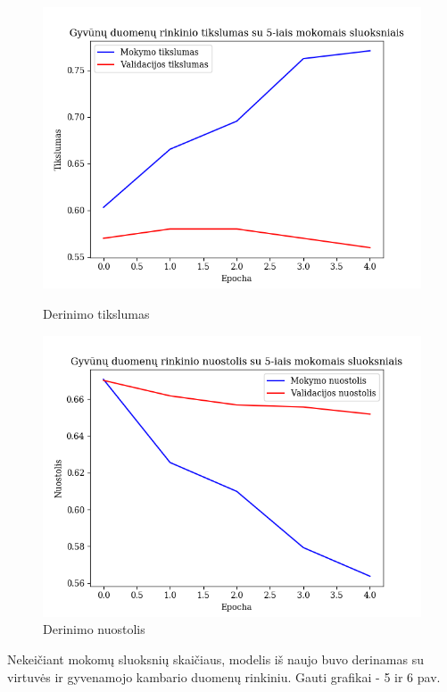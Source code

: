 \documentclass{VUMIFPSbakalaurinis}
\begin{document}
\begin{figure}[!htbp]
    \centering
    \begin{minipage}[b]{0.49\textwidth}
      \includegraphics[width=\textwidth]{img/small/5/Acc_smal_DC_5.png}
      \caption{Derinimo tikslumas}
    \end{minipage}
    \begin{minipage}[b]{0.49\textwidth}
      \includegraphics[width=\textwidth]{img/small/5/Loss_smal_DC_5.png}
      \caption{Derinimo nuostolis}
    \end{minipage}
\end{figure}

Nekeičiant mokomų sluoksnių skaičiaus, modelis iš naujo buvo derinamas su virtuvės ir gyvenamojo kambario duomenų rinkiniu. Gauti grafikai - 5 ir 6 pav.
\end{document}
